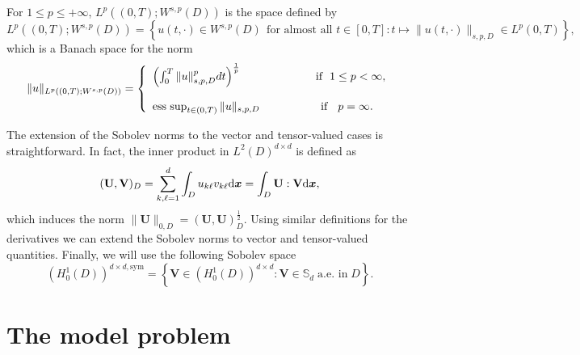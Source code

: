 \documentclass[final,12pt]{amsart}
\theoremstyle{plain}
\theoremstyle{definition}
\newcommand\bx{\boldsymbol{x}}
\begin{document}
For $1\leq p\leq +\infty$, $L^{p}((0,T);W^{s,p}(D))$ is the space defined by
\begin{equation*}
	L^{p}((0,T);W^{s,p}(D))=\left\{u(t,\cdot)\in W^{s,p}(D)~~\text{for almost all $t \in [0,T]$}  : t\mapsto \| u(t,\cdot) \|_{s,p,D}\in L^{p}(0,T)\right\} ,
\end{equation*}
which is a Banach space for the norm
\begin{equation*}
	\begin{split}	
		\|	u \|_{L^{p}((0,T);W^{s,p}(D))}	=	\left\{ \begin{array}{ll} \left(\int_{0}^{T}\| u \|_{s,p,D}^{p} dt\right)^{\frac{1}{p}} \hspace{2.3cm}{\rm if}  \hspace{0.2cm}1\leq p < \infty,\\
			\\
			{\rm ess} \hspace{0.05cm}\sup_{t\in (0,T)}\| u \|_{s,p,D}\hspace{1.9cm}{\rm if}\hspace{0.3cm} p=\infty.
		\end{array} \right.
	\end{split}		
\end{equation*}

The extension of the Sobolev norms to the vector and tensor-valued cases is straightforward. In fact,
the inner product in $L^2(D)^{d\times d}$ is defined as
\begin{equation}
	(\mathbf{U}, \mathbf{V})_{D} = \sum_{k,\ell=1}^d \int_D u_{k\ell}v_{k\ell}   {\rm d}\bx =\int_D \mathbf{U}: \mathbf{V} {\rm d}\bx,\label{innertensor}
\end{equation}
which induces the norm 
$ \|\mathbf{U}\|_{0,D} =(\mathbf{U}, \mathbf{U})_{D}^{\frac{1}{2}}$.   Using similar definitions for the derivatives
we can extend the Sobolev norms to vector and tensor-valued quantities. Finally, we will use the following
Sobolev space
\begin{equation}
	(H^{1}_{0}(D))^{d\times d,\textrm{sym}}=\left\{ \mathbf{V} \in (H^1_0(D))^{d\times d} : \mathbf{V}\in \mathbb{S}_d^{}\; \textrm{a.e. in}  \; D\right\} .\label{space-sym}
\end{equation}

\section{The model problem} \label{The modelProblem}
\end{document}
